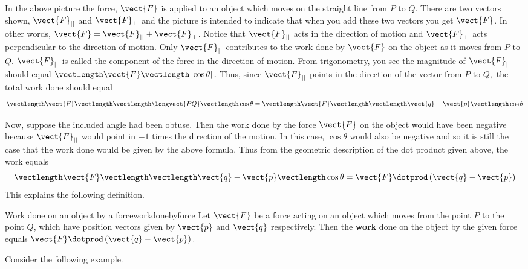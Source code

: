 In the above picture the force, $\vect{F}$ is applied to an object which moves
on the straight line from $P$ to $Q.$ There are two vectors shown, $\vect{F}_{||}$ and $\vect{F}_{\bot }$ and the
picture is intended to indicate that when you add these two vectors you get 
$\vect{F}$. In other words, $\vect{F} = \vect{F}_{||} + \vect{F}_{\bot}$. Notice that
 $\vect{F}_{||}$ acts in the direction of motion and 
$\vect{F}_{\bot }$ acts perpendicular to the direction of motion. Only 
$\vect{F}_{||}$ contributes to the work done by $\vect{F}$ on the object
as it moves from $P$ to $Q$. $\vect{F}_{||}$ is
called the component of the force in
 the direction of motion. From trigonometry, you
see the magnitude of $\vect{F}_{||}$ should equal $\vectlength \vect{F}
\vectlength \left| \cos \theta \right| .$ Thus, since $\vect{F}_{||}$ points
in the direction of the vector from $P$ to $Q,$
the total work done should equal
\begin{equation*}
\vectlength \vect{F}\vectlength \vectlength
\longvect{PQ}\vectlength \cos \theta =\vectlength
\vect{F}\vectlength \vectlength \vect{q}-\vect{p}\vectlength \cos \theta
\end{equation*}

Now, suppose the included angle had been obtuse. Then the work done by the force 
$\vect{F}$ on the object would have been negative because $\vect{F}_{||}$
would point in $-1$ times the direction of the motion.  In this case, $\cos \theta $ would also be negative and 
so it is still
the case that the work done would be given by the above formula. Thus from
the geometric description of the dot product given above, the work equals
\begin{equation*}
\vectlength \vect{F}\vectlength \vectlength \vect{q}-\vect{p}\vectlength \cos
\theta =\vect{F}\dotprod \left( \vect{q}-\vect{p}\right) 
\end{equation*}
This explains the following definition.

\begin{definition}{Work done on an object by a force}{workdonebyforce}
Let $\vect{F}$ be a force acting on an object which moves from the point 
$P$ to the point $Q$, which have position vectors given by $\vect{p}$ and $\vect{q}$ respectively.
 Then the \textbf{work} done
 on the object by the given force equals $\vect{F}\dotprod \left(
\vect{q}-\vect{p}\right) .$
\end{definition}

Consider the following example.

